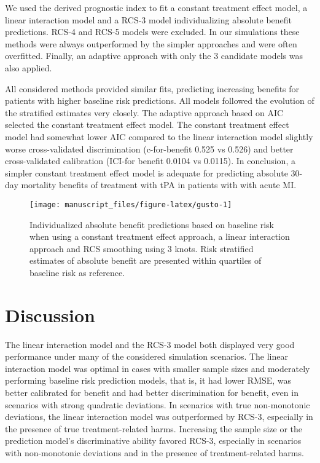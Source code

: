\documentclass[]{elsarticle} %
\begin{document}
We used the derived prognostic index to fit a constant treatment effect
model, a linear interaction model and a RCS-3 model individualizing
absolute benefit predictions. RCS-4 and RCS-5 models were excluded. In
our simulations these methods were always outperformed by the simpler
approaches and were often overfitted. Finally, an adaptive approach with
only the 3 candidate models was also applied.

All considered methods provided similar fits, predicting increasing
benefits for patients with higher baseline risk predictions. All models
followed the evolution of the stratified estimates very closely. The
adaptive approach based on AIC selected the constant treatment effect
model. The constant treatment effect model had somewhat lower AIC
compared to the linear interaction model slightly worse cross-validated
discrimination (c-for-benefit 0.525 vs 0.526) and better cross-validated
calibration (ICI-for benefit 0.0104 vs 0.0115). In conclusion, a simpler
constant treatment effect model is adequate for predicting absolute
30-day mortality benefits of treatment with tPA in patients with with
acute MI.

\begin{figure}
\texttt{[image: manuscript\_files/figure-latex/gusto-1]} \caption{Individualized absolute benefit predictions based on baseline risk when using a constant treatment effect approach, a linear interaction approach and RCS smoothing using 3 knots. Risk stratified estimates of absolute benefit are presented within quartiles of baseline risk as reference.}\label{fig:gusto}
\end{figure}

\hypertarget{discussion}{%
\section{Discussion}\label{discussion}}

The linear interaction model and the RCS-3 model both displayed very
good performance under many of the considered simulation scenarios. The
linear interaction model was optimal in cases with smaller sample sizes
and moderately performing baseline risk prediction models, that is, it
had lower RMSE, was better calibrated for benefit and had better
discrimination for benefit, even in scenarios with strong quadratic
deviations. In scenarios with true non-monotonic deviations, the linear
interaction model was outperformed by RCS-3, especially in the presence
of true treatment-related harms. Increasing the sample size or the
prediction model's discriminative ability favored RCS-3, especially in
scenarios with non-monotonic deviations and in the presence of
treatment-related harms.
\end{document}
